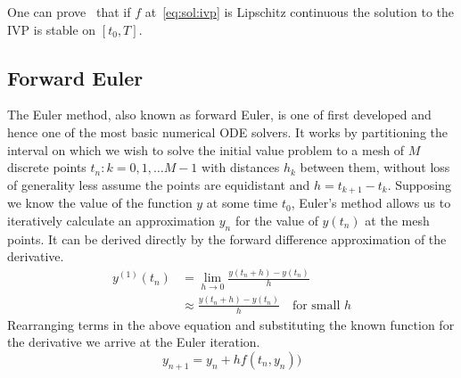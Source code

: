 \documentclass[11pt]{report}
\begin{document}
    One can prove~\cite{suli2010numerical} that if $f$ at~\eqref{eq:sol:ivp} is Lipschitz continuous the solution to the
    IVP is stable on $[t_0, T]$.

    \subsection{Forward Euler}
    The Euler method, also known as forward Euler, is one of first developed and hence one of the most basic numerical
    ODE solvers.
    It works by partitioning the interval on which we wish to solve the initial value problem to a mesh of $M$
    discrete points ${t_n: k=0,1,\dots M-1}$ with distances $h_k$ between them, without loss of generality less assume
    the points are equidistant and $h = t_{k+1} - t_k$.
    Supposing we know the value of the function $y$ at some time $t_0$, Euler's method allows us to iteratively
    calculate an approximation $y_n$ for the value of $y(t_n)$ at the mesh points.
    It can be derived directly by the forward difference approximation of the derivative.
    \begin{align}
        y^{(1)}(t_n) &= \lim_{h \to 0} \frac{y(t_n+h) - y(t_n)}{h} \\
        &\approx \frac{y(t_n+h) - y(t_n)}{ h} \quad \text{for small $h$}
    \end{align}
    Rearranging terms in the above equation and substituting the known function for the derivative we arrive at the
    Euler iteration.
    \begin{equation}
        \label{eq:euler_itr}
        y_{n+1} = y_n + h f(t_n, y_n))
    \end{equation}
\end{document}
